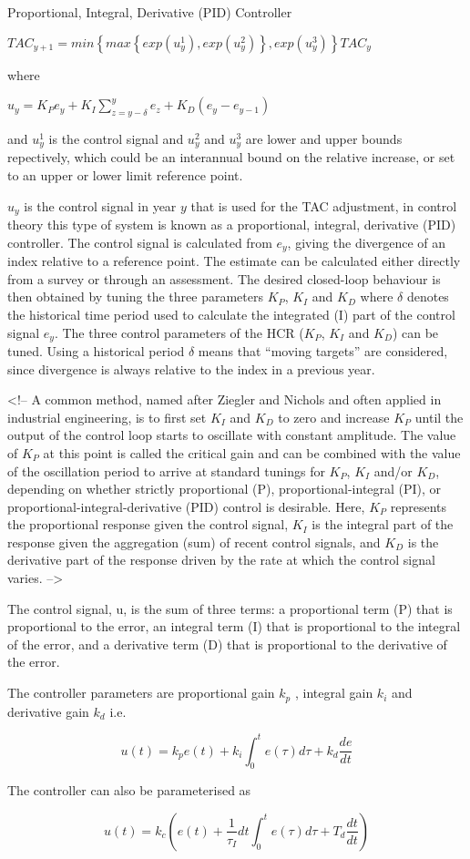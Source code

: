 Proportional, Integral, Derivative (PID) Controller

$TAC_{y+1} = min\left \{ max\left \{ exp(u^1_y), exp(u^2_y)\right \}, exp(u^3_y)\right \}TAC_y$

where

$u_y = K_Pe_y + K_I \sum_{z=y-\delta}^{y}e_z + K_D(e_y-e_{y-1})$

and $u^1_y$ is the control signal and  $u^2_y$ and $u^3_y$ are lower and upper bounds repectively, which could be an interannual bound on the relative increase, or set to an upper or lower limit reference point.

$u_y$ is the control signal in year $y$ that is used for the TAC adjustment,  in control theory this type of system is known as a proportional, integral, derivative (PID) controller. The control signal is calculated from $e_y$, giving the divergence of an index relative to a reference point. The estimate can be calculated either directly from a survey or through an assessment. The desired closed-loop behaviour is then obtained by tuning the three parameters $K_P$, $K_I$ and $K_D$ where $\delta$ denotes the historical time period used to calculate the integrated (I) part of the control signal $e_y$.  The three control parameters of the HCR ($K_P$, $K_I$ and $K_D$) can be tuned. Using a historical period $\delta$  means that “moving targets” are considered, since divergence is always relative to the index in a previous year. 

<!-- A common method, named after Ziegler and Nichols and often applied in industrial engineering, is to first set $K_I$ and $K_D$ to zero and increase $K_P$ until the output of the control loop starts to oscillate with constant amplitude. The value of $K_P$ at this point is called the critical gain and can be combined with the value of the oscillation period to arrive at standard tunings for $K_P$, $K_I$ and/or $K_D$, depending on whether strictly proportional (P), proportional-integral (PI), or proportional-integral-derivative (PID) control is desirable. Here, $K_P$ represents the proportional response given the control signal, $K_I$ is the integral part of the response given the aggregation (sum) of recent control signals, and $K_D$ is the derivative part of the response driven by the rate at which the control signal varies.  -->


The control signal, u,  is the sum of three terms: a proportional term (P) that is proportional to the error, an integral term (I) that is proportional to the integral of the error, and a derivative term (D) that is proportional to the derivative of the error. 

The controller parameters are proportional gain $k_p$ , integral gain $k_i$ and derivative gain $k_d$ i.e.

\begin{equation}
 u(t) = k_pe(t)+k_i\int_0^t e(\tau)d\tau+k_d\frac{de}{dt}
\end{equation}

The controller can also be parameterised as

\begin{equation}
u(t) = k_c \left ( e(t)+\frac{1}{\tau_I}dt\int_0^t e(\tau)d\tau+T_d\frac{dt}{dt} \right)
\end{equation}
